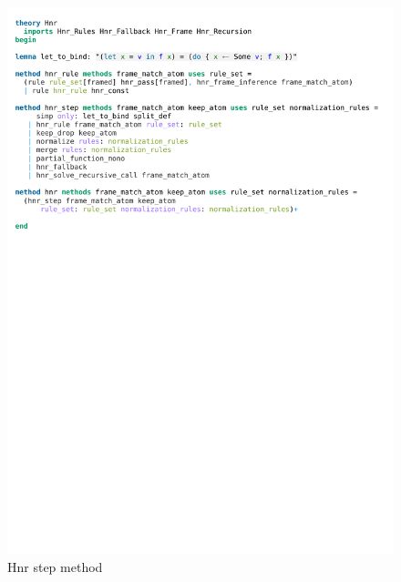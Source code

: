 \begin{figure}[htpb]
    \includegraphics[trim={0 20,2cm 0 5,3cm}, clip, width=1.00\textwidth]{figures/Theory_Hnr.pdf}
    \caption[Hnr step method]{Hnr step method}
    \label{fig:hnr_step_method}
\end{figure}

